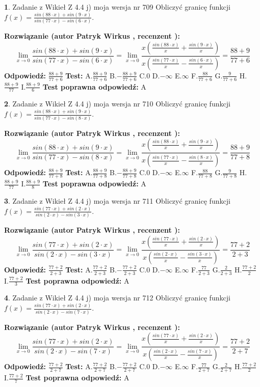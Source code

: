 \documentclass[12pt, a4paper]{article}
\theoremstyle{definition} %
\newtheorem{zad}{}
\newcommand{\zadStart}[1]{\begin{zad}#1\newline}
\newcommand{\zadStop}{\end{zad}}
\newcommand{\rozwStart}[2]{\noindent \textbf{Rozwiązanie (autor #1 , recenzent #2): }\newline}
\newcommand{\rozwStop}{\newline}
\newcommand{\odpStart}{\noindent \textbf{Odpowiedź:}\newline}
\newcommand{\odpStop}{\newline}
\newcommand{\testStart}{\noindent \textbf{Test:}\newline}
\newcommand{\testStop}{\newline}
\newcommand{\kluczStart}{\noindent \textbf{Test poprawna odpowiedź:}\newline}
\newcommand{\kluczStop}{\newline}
\begin{document}
\zadStart{Zadanie z Wikieł Z 4.4 j) moja wersja nr 709}
Obliczyć granicę funkcji $f(x)=\frac{sin(88\cdot x) +sin(9\cdot x)}{sin(77\cdot x) -sin(6\cdot x)}$.
\zadStop
\rozwStart{Patryk Wirkus}{}
$$\lim\limits_{x\to 0}\frac{sin(88\cdot x) +sin(9\cdot x)}{sin(77\cdot x) -sin(6\cdot x)}=\lim\limits_{x\to 0}\frac{x(\frac{sin(88\cdot x)}{x}+\frac{sin(9\cdot x)}{x})}{x(\frac{sin(77\cdot x)}{x}-\frac{sin(6\cdot x)}{x})}=\frac{88+9}{77+6}$$
\rozwStop
\odpStart
$\frac{88+9}{77+6}$
\odpStop
\testStart
A.$\frac{88+9}{77+6}$
B.$-\frac{88+9}{77+6}$
C.$0$
D.$-\infty$
E.$\infty$
F.$\frac{88}{77+6}$
G.$\frac{9}{77+6}$
H.$\frac{88+9}{77}$
I.$\frac{88+9}{6}$
\testStop
\kluczStart
A
\kluczStop



\zadStart{Zadanie z Wikieł Z 4.4 j) moja wersja nr 710}
Obliczyć granicę funkcji $f(x)=\frac{sin(88\cdot x) +sin(9\cdot x)}{sin(77\cdot x) -sin(8\cdot x)}$.
\zadStop
\rozwStart{Patryk Wirkus}{}
$$\lim\limits_{x\to 0}\frac{sin(88\cdot x) +sin(9\cdot x)}{sin(77\cdot x) -sin(8\cdot x)}=\lim\limits_{x\to 0}\frac{x(\frac{sin(88\cdot x)}{x}+\frac{sin(9\cdot x)}{x})}{x(\frac{sin(77\cdot x)}{x}-\frac{sin(8\cdot x)}{x})}=\frac{88+9}{77+8}$$
\rozwStop
\odpStart
$\frac{88+9}{77+8}$
\odpStop
\testStart
A.$\frac{88+9}{77+8}$
B.$-\frac{88+9}{77+8}$
C.$0$
D.$-\infty$
E.$\infty$
F.$\frac{88}{77+8}$
G.$\frac{9}{77+8}$
H.$\frac{88+9}{77}$
I.$\frac{88+9}{8}$
\testStop
\kluczStart
A
\kluczStop



\zadStart{Zadanie z Wikieł Z 4.4 j) moja wersja nr 711}
Obliczyć granicę funkcji $f(x)=\frac{sin(77\cdot x) +sin(2\cdot x)}{sin(2\cdot x) -sin(3\cdot x)}$.
\zadStop
\rozwStart{Patryk Wirkus}{}
$$\lim\limits_{x\to 0}\frac{sin(77\cdot x) +sin(2\cdot x)}{sin(2\cdot x) -sin(3\cdot x)}=\lim\limits_{x\to 0}\frac{x(\frac{sin(77\cdot x)}{x}+\frac{sin(2\cdot x)}{x})}{x(\frac{sin(2\cdot x)}{x}-\frac{sin(3\cdot x)}{x})}=\frac{77+2}{2+3}$$
\rozwStop
\odpStart
$\frac{77+2}{2+3}$
\odpStop
\testStart
A.$\frac{77+2}{2+3}$
B.$-\frac{77+2}{2+3}$
C.$0$
D.$-\infty$
E.$\infty$
F.$\frac{77}{2+3}$
G.$\frac{2}{2+3}$
H.$\frac{77+2}{2}$
I.$\frac{77+2}{3}$
\testStop
\kluczStart
A
\kluczStop



\zadStart{Zadanie z Wikieł Z 4.4 j) moja wersja nr 712}
Obliczyć granicę funkcji $f(x)=\frac{sin(77\cdot x) +sin(2\cdot x)}{sin(2\cdot x) -sin(7\cdot x)}$.
\zadStop
\rozwStart{Patryk Wirkus}{}
$$\lim\limits_{x\to 0}\frac{sin(77\cdot x) +sin(2\cdot x)}{sin(2\cdot x) -sin(7\cdot x)}=\lim\limits_{x\to 0}\frac{x(\frac{sin(77\cdot x)}{x}+\frac{sin(2\cdot x)}{x})}{x(\frac{sin(2\cdot x)}{x}-\frac{sin(7\cdot x)}{x})}=\frac{77+2}{2+7}$$
\rozwStop
\odpStart
$\frac{77+2}{2+7}$
\odpStop
\testStart
A.$\frac{77+2}{2+7}$
B.$-\frac{77+2}{2+7}$
C.$0$
D.$-\infty$
E.$\infty$
F.$\frac{77}{2+7}$
G.$\frac{2}{2+7}$
H.$\frac{77+2}{2}$
I.$\frac{77+2}{7}$
\testStop
\kluczStart
A
\kluczStop
\end{document}
